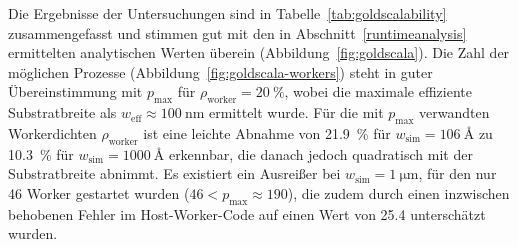 Die Ergebnisse der Untersuchungen sind in Tabelle~\ref{tab:goldscalability} zusammengefasst und stimmen gut mit den in Abschnitt~\ref{runtimeanalysis} ermittelten analytischen Werten überein (Abbildung~\ref{fig:goldscala}).
Die Zahl der möglichen Prozesse (Abbildung~\ref{fig:goldscala-workers}) steht in guter Übereinstimmung mit $p_\text{max}$ für $\rho_\text{worker} = \SI{20}{\percent}$, wobei die maximale effiziente Substratbreite als $w_\text{eff} \approx \SI{100}{\nano\meter}$ ermittelt wurde.
Für die mit $p_\text{max}$ verwandten Workerdichten $\rho_\text{worker}$ ist eine leichte Abnahme von \SI{21.9}{\percent} für $w_\text{sim} = \SI{106}{\angstrom}$ zu \SI{10.3}{\percent} für $w_\text{sim} = \SI{1000}{\angstrom}$ erkennbar, die danach jedoch quadratisch mit der Substratbreite abnimmt.
Es existiert ein Ausreißer bei $w_\text{sim} = \SI{1}{\micro\meter}$, für den nur 46 Worker gestartet wurden ($\num{46} < p_\text{max} \approx \num{190}$), die zudem durch einen inzwischen behobenen Fehler im Host-Worker-Code auf einen Wert von \num{25.4} unterschätzt wurden.

